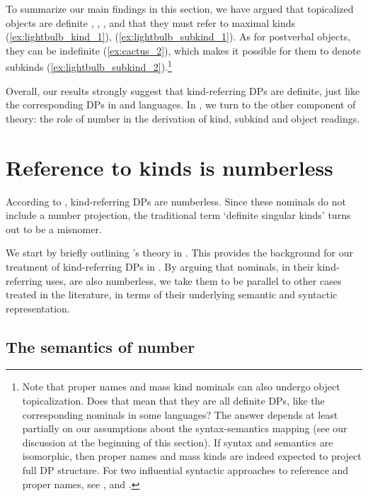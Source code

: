\documentclass[output=paper]{langscibook}
\begin{document}
To summarize our main findings in this section, we have argued that topicalized objects are definite , , , and that they must refer to maximal kinds (\ref{ex:lightbulb_kind_1}), (\ref{ex:lightbulb_subkind_1}). As for postverbal objects, they  can be indefinite (\ref{ex:cactus_2}), which makes it possible for them to denote subkinds (\ref{ex:lightbulb_subkind_2}).\footnote{Note that proper names and mass kind nominals can also undergo object topicalization. Does that mean that they are all definite DPs, like the corresponding nominals in some  languages? The answer depends at least partially on our assumptions about the syntax-semantics mapping (see our discussion at the beginning of this section). If syntax and semantics are isomorphic, then proper names and mass kinds are indeed expected to project full DP structure. For two influential syntactic approaches to reference and proper names, see \citet{Longobardi1994,Longobardi2001,Longobardi2005}, and \cite{Borer2005}.}

Overall, our results strongly suggest that  kind-referring DPs are definite, just like the corresponding DPs in  and  languages. In , we turn to the other component of  theory: the role of number in the derivation of kind, subkind and object readings.


\section{Reference to kinds is numberless} \label{sec:3-nominals_numberless}

According to \cite{Borik.Espinal2012, Borik.Espinal2015}, kind-referring DPs are numberless. Since these nominals do not include a number projection, the traditional term `definite singular kinds' turns out to be a misnomer.

We start by briefly outlining \citeauthor{Borik.Espinal2012}'s theory in . This provides the background for our treatment of  kind-referring DPs in . By arguing that  nominals, in their kind-referring uses, are also numberless, we take them to be parallel to other cases treated in the literature, in terms of their underlying semantic and syntactic representation.

\subsection{The semantics of number}
\label{sec:sem_num}
\end{document}
